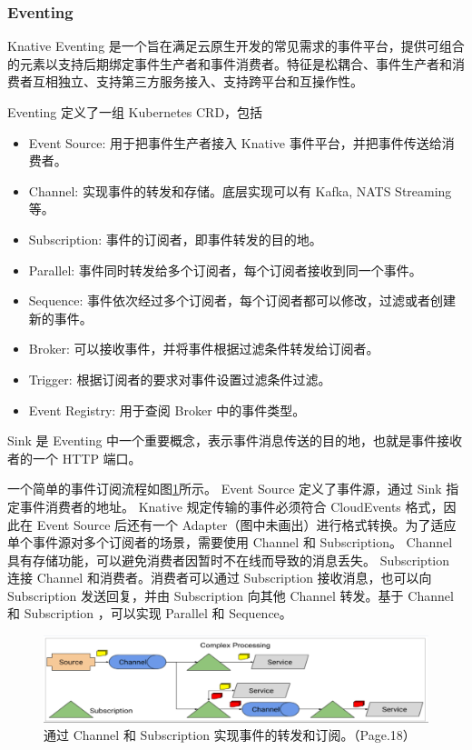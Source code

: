 \documentclass[11pt]{article}
\begin{document}
\subsubsection{Eventing}
Knative Eventing 是一个旨在满足云原生开发的常见需求的事件平台，提供可组合的元素以支持后期绑定事件生产者和事件消费者。特征是松耦合、事件生产者和消费者互相独立、支持第三方服务接入、支持跨平台和互操作性\cite{knative-eventing}。


Eventing 定义了一组 Kubernetes CRD，包括
\begin{itemize}
	\item Event Source: 用于把事件生产者接入 Knative 事件平台，并把事件传送给消费者。
	\item Channel: 实现事件的转发和存储。底层实现可以有 Kafka, NATS Streaming 等。
	\item Subscription: 事件的订阅者，即事件转发的目的地。
	\item Parallel: 事件同时转发给多个订阅者，每个订阅者接收到同一个事件。
	\item Sequence: 事件依次经过多个订阅者，每个订阅者都可以修改，过滤或者创建新的事件。
	\item Broker: 可以接收事件，并将事件根据过滤条件转发给订阅者。
	\item Trigger: 根据订阅者的要求对事件设置过滤条件过滤。
	\item Event Registry: 用于查阅 Broker 中的事件类型。
\end{itemize}

Sink 是 Eventing 中一个重要概念，表示事件消息传送的目的地，也就是事件接收者的一个 HTTP 端口。


一个简单的事件订阅流程如图\ref{knative-cha_sub}所示。 Event Source 定义了事件源，通过 Sink 指定事件消费者的地址。 Knative 规定传输的事件必须符合 CloudEvents 格式，因此在 Event Source 后还有一个 Adapter（图中未画出）进行格式转换。为了适应单个事件源对多个订阅者的场景，需要使用 Channel 和 Subscription。 Channel 具有存储功能，可以避免消费者因暂时不在线而导致的消息丢失。 Subscription 连接 Channel 和消费者。消费者可以通过 Subscription 接收消息，也可以向 Subscription 发送回复，并由 Subscription 向其他 Channel 转发。基于 Channel 和 Subscription ，可以实现 Parallel 和 Sequence。
\begin{figure}[!htbp]
	\centering
	\includegraphics[width=\textwidth]{figs/knative-cha_sub.png}
	\caption{通过 Channel 和 Subscription 实现事件的转发和订阅。（\cite{knative-eventing}Page.18）}
	\label{knative-cha_sub}
\end{figure}
\end{document}

